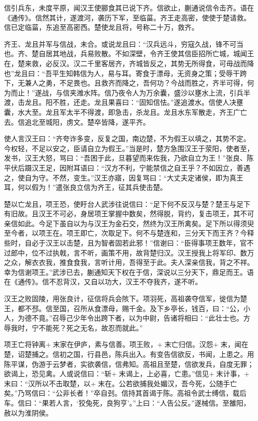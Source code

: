 \documentclass[12pt,UTF8]{ctexbook}
\begin{document}
信引兵东，未度平原，闻汉王使郦食其已说下齐。信欲止，蒯通说信令击齐。语在《通传》。信然其计，遂渡河，袭历下军，至临菑。齐王走高密，使使于楚请救。信已定临菑，东追至高密西。楚使龙且将，号称二十万，救齐。



齐王、龙且并军与信战，未合。或说龙且曰：“汉兵远斗，穷寇久战，锋不可当也。齐、楚自居其地战，兵易败散。不如深壁，令齐王使其信臣招所亡城，城闻王在，楚来救，必反汉。汉二千里客居齐，齐城皆反之，其势无所得食，可毋战而降也”龙且曰：“吾平生知韩信为人，易与耳。寄食于漂母，无资身之策；受辱干跨下，无兼人之勇，不足畏也。且救齐而降之，吾何功？今战而胜之，齐半可得，何为而止！”遂战，与信夹潍水阵。信乃夜令人为万余囊，盛沙以壅水上流，引兵半渡，击龙且。阳不胜，还走。龙且果喜曰：“固知信怯。”遂追渡水。信使人决壅囊，水大至。龙且军太半不得渡，即急击，杀龙且。龙且水东军散走，齐王广亡去。信追北至城阳，虏文。楚卒皆降，遂平齐。



使人言汉王曰：“齐夸诈多变，反复之国，南边楚，不为假王以填之，其势不定。今权轻，不足以安之，臣请自立为假王。”当是时，楚方急围汉王于荥阳，使者至，发书，汉王大怒，骂曰：“吾困于此，旦暮望而来佐我，乃欲自立为王！”张良、陈平伏后蹑汉王足，因附耳语曰：“汉方不利，宁能禁信之自王乎？不如因立，善遇之，使自为守。不然，变生。”汉王亦寤，因复骂曰：“大丈夫定诸侯，即为真王耳，何以假为！”遣张良立信为齐王，征其兵使击楚。



楚以亡龙且，项王恐，使盱台人武涉往说信曰：“足下何不反汉与楚？楚王与足下有旧故。且汉王不可必，身居项王掌握中数矣，然得脱，背约，复击项王，其不可亲信如此。今足下虽自以为与汉王为金石交，然终为汉王所禽矣。足下所以得须臾至今者，以项王在。项王即亡，次取足下。何不与楚连和，三分天下而王齐？今释些时，自必于汉王以击楚，且为智者固若此邪！”信谢曰：“臣得事项王数年，官不过郎中，位不过执戟，言不听，画策不用，故背楚归汉。汉王授我上将军印、数万之众，解衣衣我，推食食我，言听计用，吾得至于此。夫人深亲信我，背之不祥。幸为信谢项王。”武涉已去，蒯通知天下权在于信，深说以三分天下，鼎足而王。语在《通传》。信不忍背汉，又自以功大，汉王不夺我齐，遂不听。



汉王之败固陵，用张良计，征信将兵会陔下。项羽死，高祖袭夺信军，徙信为楚王，都不邳。信至国，召所从食漂母，赐千金。及下乡亭长，钱百，曰：“公，小人，为德不竟。”召辱己少年令出跨下者，以为中尉，告诸将相曰：“此壮士也。方辱我时，宁不能死？死之无名，故忍而就此。”



项王亡将钟离+末家在伊庐，素与信善。项王败，+末亡归信。汉怨+末，闻在楚，诏楚捕之。信初之国，行县邑，陈兵出入。有变告信欲反，书闻，上患之。用陈平谋，伪游于云梦者，实欲袭信，信弗知。高祖且至楚，信欲发兵，自度无罪；欲谒上，恐见禽。人或说信曰：“斩+末谒上，上必喜，亡患。”信见+末计事，+末曰：“汉所以不击取楚，以+末在。公若欲捕我处媚汉，吾今死，公随手亡矣。”乃骂信曰：“公非长者！”卒自刭。信持其首谒于陈。高祖令武士缚信，载后车。信曰：“果若人言，‘狡兔死，良狗亨’。”上曰：“人告公反。”遂械信。至雒阳，赦以为淮阴侯。
\end{document}
